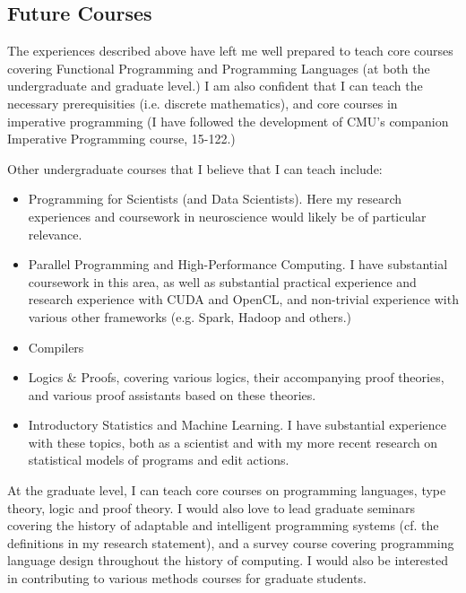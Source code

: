 \documentclass[9pt]{extarticle}
\begin{document}
\subsection*{Future Courses}
The experiences described above have left me well prepared to teach core courses covering Functional Programming and Programming Languages (at both the undergraduate and graduate level.) I am also confident that I can teach the necessary prerequisities (i.e. discrete mathematics), and core courses in imperative programming (I have followed the development of CMU's companion Imperative Programming course, 15-122.) 

Other undergraduate courses that I believe that I can teach include:
\begin{itemize}
\item Programming for Scientists (and Data Scientists). Here my research experiences and coursework in neuroscience would likely be of particular relevance.
\item Parallel Programming and High-Performance Computing. I have substantial coursework in this area, as well as substantial practical experience and research experience with CUDA and OpenCL, and non-trivial experience with various other frameworks (e.g. Spark, Hadoop and others.)
\item Compilers
\item Logics \& Proofs, covering various logics, their accompanying proof theories, and various proof assistants based on these theories.
\item Introductory Statistics and Machine Learning. I have substantial experience with these topics, both as a scientist and with my more recent research on statistical models of programs and edit actions.
\end{itemize}

At the graduate level, I can teach core courses on programming languages, type theory, logic and proof theory. I would also love to lead graduate seminars covering the history of adaptable and intelligent programming systems (cf. the definitions in my research statement), and a survey course covering programming language design throughout the history of computing. I would also be interested in contributing to various methods courses for graduate students.
\end{document}
